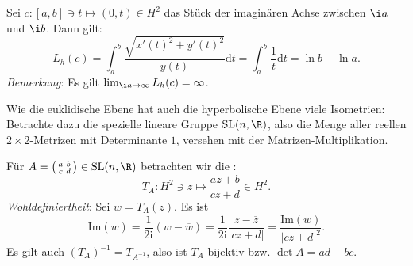 \begin{example}
  Sei \( c: [a,b] \ni t \mapsto (0,t) \in H^2 \) das Stück der imaginären Achse zwischen \( \i a \) und \( \i b \). Dann gilt:
  \begin{equation*}
    L_h(c) = \int_a^b \frac{\sqrt{{x'(t)}^2 + {y'(t)}^2}}{y(t)}\text{d}t = \int_a^b \frac{1}{t}\text{d}t = \ln b - \ln a\text{.}
  \end{equation*}
  \emph{Bemerkung}: Es gilt \( \lim_{\i a \to \infty}L_h(c) = \infty \).
\end{example}

Wie die euklidische Ebene hat auch die hyperbolische Ebene viele Isometrien: \\
Betrachte dazu die spezielle lineare Gruppe \( \text{SL}(n,\R) \), also die Menge aller reellen \( 2 \times 2 \)-Metrizen mit Determinante \( 1 \), versehen mit der Matrizen-Multiplikation. \\

\begin{definition}
  Für \( A = \left( \begin{smallmatrix}
    a & b \\ c & d
  \end{smallmatrix} \right) \in \text{SL}(n,\R) \) betrachten wir die :
  \begin{equation*}
    T_A: H^2 \ni z \mapsto \frac{az + b}{cz + d} \in H^2\text{.}
  \end{equation*}
  \emph{Wohldefiniertheit}: Sei \( w = T_A(z) \). Es ist
  \begin{equation*}
    \text{Im}(w) = \frac{1}{2\text{i}}(w-\overline{w}) = \frac{1}{2\text{i}} \frac{z - \overline{z}}{\left\vert cz + d \right\vert} = \frac{\text{Im}(w)}{\left\vert cz + d \right\vert^2}\text{.}
  \end{equation*}
  Es gilt auch \( (T_A)^{-1} = T_{A^{-1}} \), also ist \( T_A \) bijektiv bzw. \( \det A = ad - bc \).
\end{definition}

